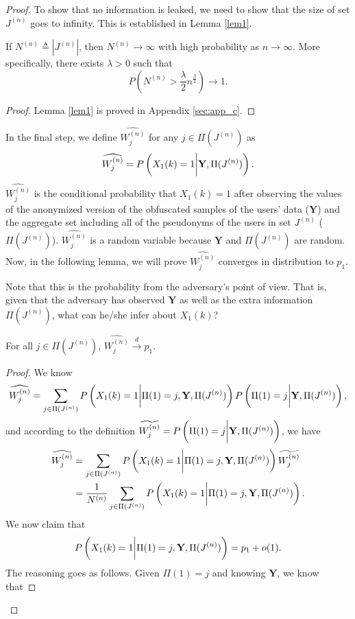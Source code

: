 \begin{proof}
To show that no information is leaked, we need to show that the size of set $J^{(n)}$ goes to infinity. This is established in Lemma \ref{lem1}.

\begin{lem}
	\label{lem1}
	If $N^{(n)} \triangleq |J^{(n)}| $, then $N^{(n)} \rightarrow \infty$ with high probability as $n \rightarrow \infty$.  More specifically, there exists $\lambda>0$ such that
\[
	P\left(N^{(n)} > \frac{\lambda}{2}n^{\frac{\beta}{2}}\right) \rightarrow 1.
	\]
\end{lem}

\begin{proof}
Lemma \ref{lem1} is proved in Appendix \ref{sec:app_c}.
\end{proof}

In the final step, we define $\widehat{W_j^{(n)}}$ for any $j \in \Pi (J^{(n)})$ as
\[\widehat{W_j^{(n)}}=P\left(X_1(k)=1 \bigg{|} \textbf{Y}, \Pi (J^{(n)})\right).\]
$\widehat{W_j^{(n)}}$ is the conditional probability that $X_1(k)=1$ after observing the values of the anonymized version of the obfuscated samples of the users' data ($\textbf{Y}$) and the aggregate set including all of the pseudonyms of the users in set $J^{(n)}$ ($\Pi (J^{(n)})$). $\widehat{W_j^{(n)}} $ is a random variable because $\textbf{Y}$ and $\Pi (J^{(n)})$ are random. Now, in the following lemma, we will prove $\widehat{W_j^{(n)}}$ converges in distribution to $p_1$.

Note that this is the probability from the adversary's point of view. That is, given that the adversary has observed $\textbf{Y}$ as well as the extra information $ \Pi (J^{(n)})$, what can he/she infer about $X_1(k)$?
\begin{lem}
	\label{lem4}
	For all $j \in \Pi (J^{(n)})$, $\widehat{W_j^{(n)}} \xrightarrow{d} p_1.$
\end{lem}

\begin{proof}
We know
\begin{align*}
\widehat{W_j^{(n)}}= \sum_{j \in \Pi(J^{(n)})} P\left(X_1(k)=1 \bigg{|} \Pi(1)=j, \textbf{Y}, \Pi (J^{(n)})\right) P\left(\Pi(1)=j \bigg{|} \textbf{Y}, \Pi (J^{(n)})\right),
\end{align*}
and according to the definition $\widetilde{W_j^{(n)}}=P \left(\Pi(1)=j \bigg{|} \textbf{Y}, \Pi (J^{(n)})\right)$, we have
	\begin{align}
	\nonumber \widehat{W_j^{(n)}} &= \sum_{j \in \Pi(J^{(n)})} P\left(X_1(k)=1 \bigg{|} \Pi(1)=j, \textbf{Y}, \Pi (J^{(n)})\right) \widetilde{W_j^{(n)}}\\
	\nonumber &= \frac{1}{N^{(n)}} \sum_{j \in \Pi(J^{(n)})} P\left(X_1(k)=1 \bigg{|} \Pi(1)=j, \textbf{Y}, \Pi (J^{(n)})\right).
	\end{align}
We now claim that
\[
 P\left(X_1(k)=1 \bigg{|} \Pi(1)=j, \textbf{Y}, \Pi (J^{(n)})\right)=p_1+o(1).
\]
The reasoning goes as follows. Given $\Pi(1)=j$ and knowing $\textbf{Y}$, we know that


\end{proof}
\end{proof}
